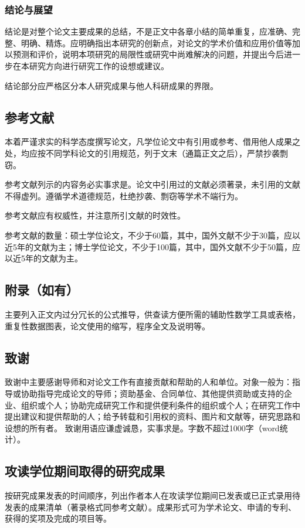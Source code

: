 \subsubsection{结论与展望}
结论是对整个论文主要成果的总结，不是正文中各章小结的简单重复，应准确、完整、明确、精炼。应明确指出本研究的创新点，对论文的学术价值和应用价值等加以预测和评价，说明本项研究的局限性或研究中尚难解决的问题，并提出今后进一步在本研究方向进行研究工作的设想或建议。

结论部分应严格区分本人研究成果与他人科研成果的界限。

\subsection{参考文献}
本着严谨求实的科学态度撰写论文，凡学位论文中有引用或参考、借用他人成果之处，均应按不同学科论文的引用规范，列于文末（通篇正文之后），严禁抄袭剽窃。

参考文献列示的内容务必实事求是。论文中引用过的文献必须著录，未引用的文献不得虚列。遵循学术道德规范，杜绝抄袭、剽窃等学术不端行为。

参考文献应有权威性，并注意所引文献的时效性。

参考文献的数量：硕士学位论文，不少于60篇，其中，国外文献不少于30篇，应以近5年的文献为主；博士学位论文，不少于100篇，其中，国外文献不少于50篇，应以近5年的文献为主。

\subsection{附录（如有）}
主要列入正文内过分冗长的公式推导，供查读方便所需的辅助性数学工具或表格，重复性数据图表，论文使用的缩写，程序全文及说明等。
\subsection{致谢}
致谢中主要感谢导师和对论文工作有直接贡献和帮助的人和单位。对象一般为：指导或协助指导完成论文的导师；资助基金、合同单位、其他提供资助或支持的企业、组织或个人；协助完成研究工作和提供便利条件的组织或个人；在研究工作中提出建议和提供帮助的人；给予转载和引用权的资料、图片和文献等，研究思路和设想的所有者。
致谢用语应谦虚诚恳，实事求是。字数不超过1000字（word统计）。

\subsection{攻读学位期间取得的研究成果}
按研究成果发表的时间顺序，列出作者本人在攻读学位期间已发表或已正式录用待发表的成果清单（著录格式同参考文献）。成果形式可为学术论文、申请的专利、获得的奖项及完成的项目等。